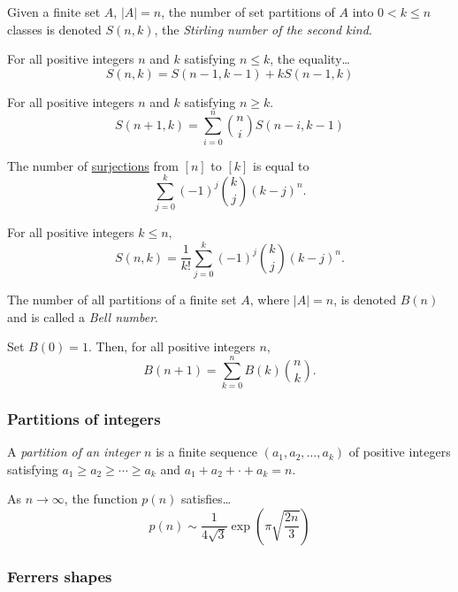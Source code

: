 Given a finite set $A$, $|A| = n$, the number of set partitions of $A$ into $0 < k \leq n$ classes is denoted $S(n,k)$, the \emph{Stirling number of the second kind}.

\begin{theorem}
For all positive integers $n$ and $k$ satisfying $n \leq k$, the equality\dots
$$S(n,k) = S(n-1,k-1) + kS(n-1,k)$$
\end{theorem}

\begin{theorem}
For all positive integers $n$ and $k$ satisfying $n \geq k$.
$$S(n+1,k) = \sum_{i=0}^n {n \choose i} S(n-i, k-1)$$
\end{theorem}

\begin{theorem}
The number of \hyperref[surjection]{surjections} from $[n]$ to $[k]$ is equal to
$$\sum^k_{j=0} (-1)^j {k \choose j} (k-j)^n.$$
\end{theorem}

\begin{corollary}
For all positive integers $k \leq n,$
$$S(n,k) = \frac{1}{k!}\sum^k_{j=0} (-1)^j {k \choose j} (k-j)^n.$$
\end{corollary}

\label{bellnumbers}
The number of all partitions of a finite set $A$, where $|A| = n$, is denoted $B(n)$ and is called a \emph{Bell number}.

\begin{theorem}
Set $B(0) = 1$. Then, for all positive integers $n$,
$$B(n+1)=\sum_{k=0}^n B(k) {n \choose k}.$$
\end{theorem}

\subsubsection{Partitions of integers}\label{integerpartitions}

A \emph{partition of an integer} $n$ is a finite sequence $(a_1, a_2,\dots,a_k)$ of positive integers satisfying $a_1 \geq a_2 \geq \cdots \geq a_k$ and $a_1 + a_2 + \cdot + a_k = n$.

\begin{theorem}
As $n \rightarrow \infty$, the function $p(n)$ satisfies\dots
$$p(n)\sim\frac{1}{4\sqrt{3}}\exp{\left(\pi\sqrt{\frac{2n}{3}}\right)}$$
\end{theorem}

\subsubsection{Ferrers shapes}\label{ferrers}


